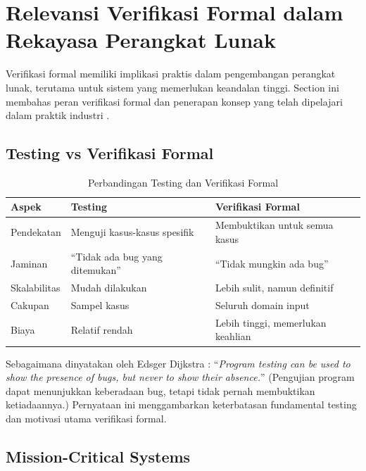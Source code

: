 \section{Relevansi Verifikasi Formal dalam Rekayasa Perangkat Lunak}

Verifikasi formal memiliki implikasi praktis dalam pengembangan perangkat lunak, terutama untuk sistem yang memerlukan keandalan tinggi. Section ini membahas peran verifikasi formal dan penerapan konsep yang telah dipelajari dalam praktik industri \cite{rosen2019}.

\subsection{Testing vs Verifikasi Formal}

\begin{table}[H]
\centering
\renewcommand{\arraystretch}{1.3}
\begin{tabular}{|>{\raggedright\arraybackslash}p{4cm}|>{\raggedright\arraybackslash}p{4cm}|>{\raggedright\arraybackslash}p{4.5cm}|}
\hline
\textbf{Aspek} & \textbf{Testing} & \textbf{Verifikasi Formal} \\ \hline
Pendekatan & Menguji kasus-kasus spesifik & Membuktikan untuk semua kasus \\ \hline
Jaminan & ``Tidak ada bug yang ditemukan'' & ``Tidak mungkin ada bug'' \\ \hline
Skalabilitas & Mudah dilakukan & Lebih sulit, namun definitif \\ \hline
Cakupan & Sampel kasus & Seluruh domain input \\ \hline
Biaya & Relatif rendah & Lebih tinggi, memerlukan keahlian \\ \hline
\end{tabular}
\caption{Perbandingan Testing dan Verifikasi Formal}
\end{table}

Sebagaimana dinyatakan oleh Edsger Dijkstra \cite{dijkstra1970}: ``\textit{Program testing can be used to show the presence of bugs, but never to show their absence.}'' (Pengujian program dapat menunjukkan keberadaan bug, tetapi tidak pernah membuktikan ketiadaannya.) Pernyataan ini menggambarkan keterbatasan fundamental testing dan motivasi utama verifikasi formal.

\subsection{Mission-Critical Systems}

